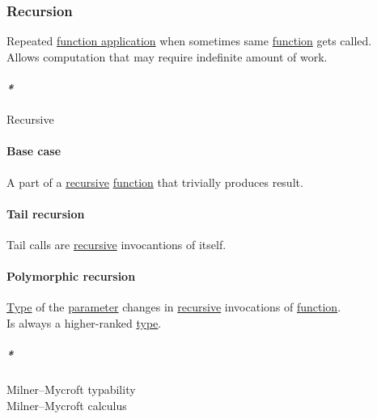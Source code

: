 \documentclass[11pt]{article}
\begin{document}
\subsubsection{\label{orgc27dbaf}Recursion}
\label{sec:org9dd9f76}
Repeated \hyperref[org6ff03b0]{function application} when sometimes same \hyperref[orgeb5cddb]{function} gets called.\\

Allows computation that may require indefinite amount of work.\\

\paragraph{\emph{*}}
\label{sec:orga42a09e}

\label{org06bac4d}Recursive\\

\paragraph{\label{org0e15f55}Base case}
\label{sec:orgb2df58b}
A part of a \hyperref[org06bac4d]{recursive} \hyperref[orgeb5cddb]{function} that trivially produces result.\\

\paragraph{\label{org9ded97a}Tail recursion}
\label{sec:orgf3cadd5}
Tail calls are \hyperref[org06bac4d]{recursive} invocantions of itself.\\

\paragraph{\label{org81579f1}Polymorphic recursion}
\label{sec:org098f2f0}
\hyperref[org4fbaeb8]{Type} of the \hyperref[org45d4a16]{parameter} changes in \hyperref[org06bac4d]{recursive} invocations of \hyperref[orgeb5cddb]{function}.\\

Is always a higher-ranked \hyperref[org4fbaeb8]{type}.\\

\subparagraph{\emph{*}}
\label{sec:orgbc007b0}

\label{org165e46e}Milner–Mycroft typability\\
\label{org98f0a1c}Milner–Mycroft calculus\\
\end{document}
